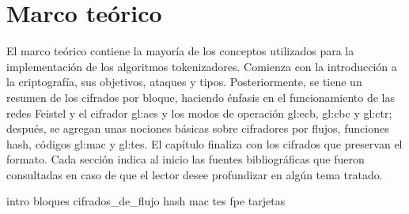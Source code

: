 %
%

\chapter{Marco teórico}
\label{sec:marco_teorico}

El marco teórico contiene la mayoría de los conceptos utilizados para la
implementación de los algoritmos tokenizadores. Comienza con la introducción a
la criptografía, sus objetivos, ataques y tipos. Posteriormente, se tiene un
resumen de los cifrados por bloque, haciendo énfasis en el funcionamiento de las
redes Feistel y el cifrador \gls{gl:aes} y los modos de operación \gls{gl:ecb},
\gls{gl:cbc} y \gls{gl:ctr}; después, se agregan unas nociones básicas sobre
cifradores por flujos, funciones hash, códigos \gls{gl:mac} y \gls{gl:tes}. El
capítulo finaliza con los cifrados que preservan el formato. Cada sección
indica al inicio las fuentes bibliográficas que fueron consultadas en caso de
que el lector desee profundizar en algún tema tratado.

{intro}
{bloques}
{cifrados_de_flujo}
{hash}
{mac}
{tes}
{fpe}
{tarjetas}
